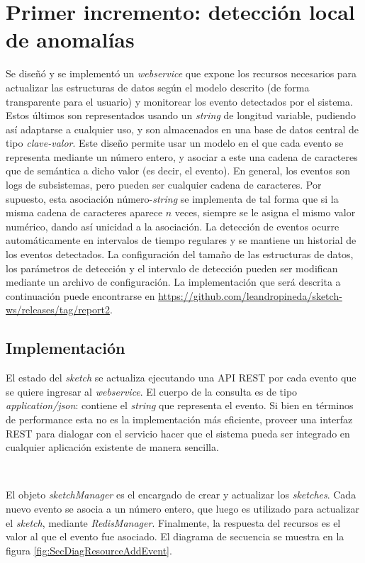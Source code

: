 \documentclass[a4paper,10pt, oneside]{article}
\begin{document}
\section{Primer incremento: detección local de anomalías}
Se diseñó y se implementó un \textit{webservice} que expone los recursos necesarios para actualizar las estructuras de datos según el modelo descrito (de forma transparente para el usuario) y monitorear los evento detectados por el sistema. Estos últimos son representados usando un \textit{string} de longitud variable, pudiendo así adaptarse a cualquier uso, y son almacenados en una base de datos central de tipo \textit{clave-valor}. Este diseño permite usar un modelo en el que cada evento se representa mediante un número entero, y asociar a este una cadena de caracteres que de semántica a dicho valor (es decir, el evento). En general, los eventos son logs de subsistemas, pero pueden ser cualquier cadena de caracteres. Por supuesto, esta asociación número-\textit{string} se implementa de tal forma que si la misma cadena de caracteres aparece $n$ veces, siempre se le asigna el mismo valor numérico, dando así unicidad a la asociación. La detección de eventos ocurre automáticamente en intervalos de tiempo regulares y se mantiene un historial de los eventos detectados. La configuración del tamaño de las estructuras de datos, los parámetros de detección y el intervalo de detección pueden ser modifican mediante un archivo de configuración.
La implementación que será descrita a continuación puede encontrarse en  \url{https://github.com/leandropineda/sketch-ws/releases/tag/report2}.

\subsection*{Implementación}

El estado del \textit{sketch} se actualiza ejecutando una API REST por cada evento que se quiere ingresar al \textit{webservice}. El cuerpo de la consulta es de tipo \textit{application/json}\cite{rfc4627}: contiene el \textit{string} que representa el evento. Si bien en términos de performance esta no es la implementación más eficiente, proveer una interfaz REST para dialogar con el servicio hacer que el sistema pueda ser integrado en cualquier aplicación existente de manera sencilla. 

\

El objeto \textit{sketchManager} es el encargado de crear y actualizar los \textit{sketches}. Cada nuevo evento se asocia a un número entero, que luego es utilizado para actualizar el \textit{sketch}, mediante \textit{RedisManager}. Finalmente, la respuesta del recursos es el valor al que el evento fue asociado. El diagrama de secuencia se muestra en la figura \ref{fig:SecDiagResourceAddEvent}.
\end{document}
